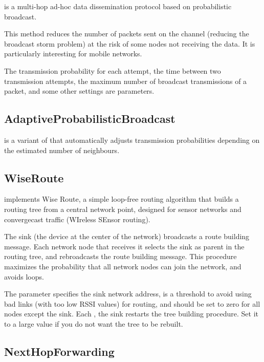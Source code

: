  is a multi-hop ad-hoc data dissemination
protocol based on probabilistic broadcast.

This method reduces the number of packets sent on the channel (reducing the
broadcast storm problem) at the risk of some nodes not receiving the data.
It is particularly interesting for mobile networks.

The transmission probability for each attempt, the time between two transmission
attempts, the maximum number of broadcast transmissions of a packet, and
some other settings are parameters.

\subsection{AdaptiveProbabilisticBroadcast}
\label{sec:networkprotocols:adaptiveprobabilisticbroadcast}

 is a variant of
 that automatically adjusts transmission
probabilities depending on the estimated number of neighbours.

\subsection{WiseRoute}
\label{sec:networkprotocols:wiseroute}

 implements Wise Route, a simple loop-free routing algorithm
that builds a routing tree from a central network point, designed for sensor
networks and convergecast traffic (WIreless SEnsor routing).

The sink (the device at the center of the network) broadcasts a route building
message. Each network node that receives it selects the sink as parent in the
routing tree, and rebroadcasts the route building message. This procedure
maximizes the probability that all network nodes can join the network, and
avoids loops.

The  parameter specifies the sink network address,
 is a threshold to avoid using bad links (with too low RSSI
values) for routing, and  should be set to zero for
all nodes except the sink. Each , the sink restarts
the tree building procedure. Set it to a large value if you do not want the tree
to be rebuilt.

\subsection{NextHopForwarding}
\label{sec:networkprotocols:nexthopforwarding}


